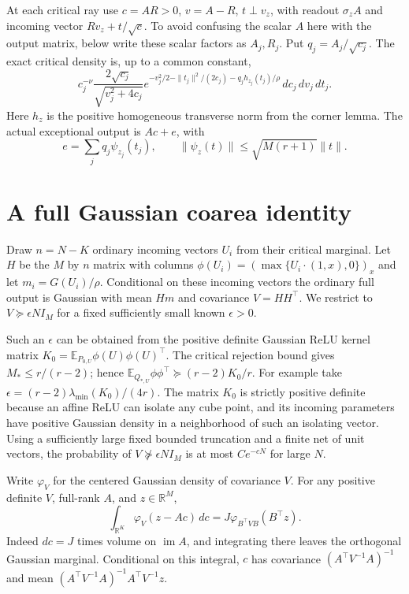 \documentclass[11pt]{article}
\newcommand{\E}{\mathbb E}\newcommand{\R}{\mathbb R}
\begin{document}
At each critical ray use $c=AR>0$, $v=A-R$, $t\perp v_z$, with
readout $\sigma_z A$ and incoming vector $Rv_z+t/\sqrt c$.
To avoid confusing the scalar $A$ here with the output matrix, below
write these scalar factors as $A_j,R_j$. Put $q_j=A_j/\sqrt{c_j}$.
The exact critical density is, up to a common constant,
\[
 c_j^{-\nu}\frac{2\sqrt{c_j}}{\sqrt{v_j^2+4c_j}}
 e^{-v_j^2/2-\|t_j\|^2/(2c_j)-q_jh_{z_j}(t_j)/\rho}\,dc_j\,dv_j\,dt_j.
 \tag{2}
\]
Here $h_z$ is the positive homogeneous transverse norm from the corner
lemma. The actual exceptional output is $Ac+e$, with
\[
 e=\sum_jq_j\psi_{z_j}(t_j),\qquad
 \|\psi_z(t)\|\le\sqrt{M(r+1)}\|t\|.                  \tag{3}
\]

\section{A full Gaussian coarea identity}
Draw $n=N-K$ ordinary incoming vectors $U_i$ from their critical marginal.
Let $H$ be the $M$ by $n$ matrix with columns
$\phi(U_i)=(\max\{U_i\cdot(1,x),0\})_x$ and let
$m_i=G(U_i)/\rho$. Conditional on these incoming vectors the ordinary
full output is Gaussian with mean $Hm$ and covariance $V=HH^\top$.
We restrict to $V\succeq\epsilon NI_M$ for a fixed sufficiently small
known $\epsilon>0$.

Such an $\epsilon$ can be obtained from the positive definite Gaussian
ReLU kernel matrix $K_0=\E_{P_{0,U}}\phi(U)\phi(U)^\top$.
The critical rejection bound gives $M_*\le r/(r-2)$; hence
$\E_{Q_{*,U}}\phi\phi^\top\succeq(r-2)K_0/r$.
For example take $\epsilon=(r-2)\lambda_{\min}(K_0)/(4r)$.
The matrix $K_0$ is strictly positive definite because an affine ReLU
can isolate any cube point, and its incoming parameters have positive
Gaussian density in a neighborhood of such an isolating vector.
Using a sufficiently large fixed bounded truncation and a finite net
of unit vectors, the probability of $V\not\succeq\epsilon NI_M$
is at most $Ce^{-cN}$ for large $N$.

Write $\varphi_V$ for the centered Gaussian density of covariance $V$.
For any positive definite $V$, full-rank $A$, and $z\in\R^M$,
\[
 \int_{\R^K}\varphi_V(z-Ac)\,dc
                =J\varphi_{B^\top VB}(B^\top z).        \tag{4}
\]
Indeed $dc=J$ times volume on $\operatorname{im}A$, and integrating
there leaves the orthogonal Gaussian marginal. Conditional on this
integral, $c$ has covariance $(A^\top V^{-1}A)^{-1}$ and mean
$(A^\top V^{-1}A)^{-1}A^\top V^{-1}z$.
\end{document}
